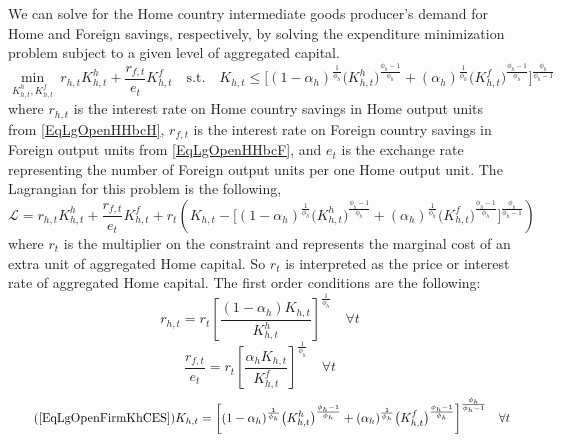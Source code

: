 \documentclass[letterpaper,12pt]{article}
\theoremstyle{definition}
\begin{document}
    We can solve for the Home country intermediate goods producer's demand for Home and Foreign savings, respectively, by solving the expenditure minimization problem subject to a given level of aggregated capital.
    \begin{equation}\label{EqLgOpenFirmMinProbH}
      \min_{K^h_{h,t},K^f_{h,t}} \: r_{h,t} K^h_{h,t} + \frac{r_{f,t}}{e_t}K^f_{h,t} \quad \text{s.t.} \quad K_{h,t} \leq \biggl[(1 - \alpha_h)^\frac{1}{\phi_h}\bigl(K^h_{h,t}\bigr)^\frac{\phi_h-1}{\phi_h} + (\alpha_h)^\frac{1}{\phi_h}\bigl(K^f_{h,t}\bigr)^\frac{\phi_h-1}{\phi_h}\biggr]^\frac{\phi_h}{\phi_h-1}
    \end{equation}
    where $r_{h,t}$ is the interest rate on Home country savings in Home output units from \eqref{EqLgOpenHHbcH}, $r_{f,t}$ is the interest rate on Foreign country savings in Foreign output units from \eqref{EqLgOpenHHbcF}, and $e_t$ is the exchange rate representing the number of Foreign output units per one Home output unit. The Lagrangian for this problem is the following,
    \begin{equation}\label{EqLgOpenFirmlagrH}
      \mathcal{L} = r_{h,t}K^h_{h,t} + \frac{r_{f,t}}{e_t}K^f_{h,t} + r_t\left(K_{h,t} - \biggl[(1 - \alpha_h)^\frac{1}{\phi_h}\bigl(K^h_{h,t}\bigr)^\frac{\phi_h-1}{\phi_h} + (\alpha_h)^\frac{1}{\phi_h}\bigl(K^f_{h,t}\bigr)^\frac{\phi_h-1}{\phi_h}\biggr]^\frac{\phi_h}{\phi_h-1}\right)
    \end{equation}
    where $r_t$ is the multiplier on the constraint and represents the marginal cost of an extra unit of aggregated Home capital. So $r_t$ is interpreted as the price or interest rate of aggregated Home capital. The first order conditions are the following:
    \begin{equation}\label{EqLgOpenFirmfocKhh}
      r_{h,t} = r_t\left[\frac{(1-\alpha_h)K_{h,t}}{K^h_{h,t}}\right]^{\frac{1}{\phi_h}} \quad\forall t
    \end{equation}
    \begin{equation}\label{EqLgOpenFirmfocKhf}
      \frac{r_{f,t}}{e_t} = r_t\left[\frac{\alpha_h K_{h,t}}{K^f_{h,t}}\right]^{\frac{1}{\phi_h}} \quad\forall t
    \end{equation}
    \begin{equation}\tag{\ref{EqLgOpenFirmKhCES}}
      K_{h,t}= \biggl[(1 - \alpha_h)^\frac{1}{\phi_h}\bigl(K^h_{h,t}\bigr)^\frac{\phi_h-1}{\phi_h} + (\alpha_h)^\frac{1}{\phi_h}\bigl(K^f_{h,t}\bigr)^\frac{\phi_h-1}{\phi_h}\biggr]^\frac{\phi_h}{\phi_h-1} \quad\forall t
    \end{equation}
\end{document}
